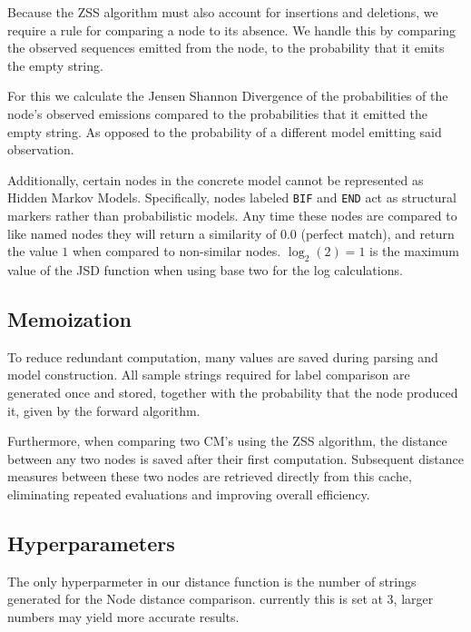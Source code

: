 Because the ZSS algorithm must also account for insertions and deletions, we require a
rule for comparing a node to its absence. We handle this by comparing the 
observed sequences emitted from the node, to the probability that it emits the empty string. 

For this we calculate the Jensen Shannon Divergence of the probabilities of the node's observed emissions
compared to the probabilities that it emitted the empty string. As opposed to the probability of a different model 
emitting said observation. 

Additionally, certain nodes in the concrete model cannot be represented as
Hidden Markov Models. Specifically, nodes labeled \texttt{BIF} and \texttt{END} act as structural markers rather than probabilistic models. Any time these nodes are compared 
to like named nodes they will return a similarity of 0.0 (perfect match), and return the value $1$ when 
compared to non-similar nodes. $\log_2(2) = 1$ is the maximum value of the JSD function when using base two for the log
calculations.



\subsection{Memoization}
To reduce redundant computation, many values are saved during parsing and model
construction. All sample strings required for label comparison are generated once and
stored, together with the probability that the node produced it, given by the forward algorithm.

Furthermore, when comparing two CM's using the ZSS algorithm, the distance
between any two nodes is saved after their first computation. Subsequent distance measures between these two nodes
are retrieved directly from this cache, eliminating repeated evaluations and improving
overall efficiency.

\subsection{Hyperparameters}

The only hyperparmeter in our distance function is the number of strings generated for the Node distance comparison. currently
this is set at 3, larger numbers may yield more accurate results. 







